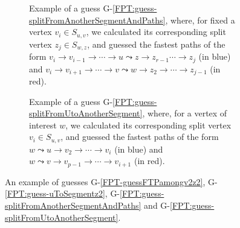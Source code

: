 \documentclass[a4paper,UKenglish,cleveref, autoref, thm-restate]{lipics-v2021}
\begin{document}
\begin{figure}[t]
	\begin{subfigure}[b]{0.48\textwidth}
			\centering
			\caption{Example of a guess G-\ref{FPT:guess-splitFromAnotherSegmentAndPaths}, where, for fixed a vertex $v_i \in S_{u,v}$,
				we calculated its corresponding split vertex $z_j \in S_{w,z}$,
				and guessed the fastest paths of the form
				$v_i \rightarrow v_{i-1} \rightarrow \cdots \rightarrow u \leadsto z \rightarrow z_{r-1} \cdots \rightarrow z_j$ (in blue) 
				and $v_i \rightarrow v_{i+1} \rightarrow \cdots \rightarrow v \leadsto w \rightarrow z_2 \rightarrow \cdots \rightarrow z_{j-1}$ (in red). 
				\label{fig:FPT-guessG6}}
		\end{subfigure}
	\quad
	\begin{subfigure}[b]{0.48\textwidth}
		\centering
	\caption{Example of a guess G-\ref{FPT:guess-splitFromUtoAnotherSegment}, where, for a vertex of interest $w$, 
		we
		calculated its corresponding split vertex $v_i \in S_{u,v}$,
		and guessed the fastest paths of the form
		$w \leadsto u \rightarrow v_2 \rightarrow \cdots \rightarrow v_i$  (in blue) 
		and $w \leadsto v \rightarrow v_{p-1} \rightarrow \cdots \rightarrow v_{i+1}$ (in red). 
		\label{fig:FPT-guessG7}}
	\end{subfigure}
\caption{An example of guesses G-\ref{FPT-guessFTPamongv2z2}, G-\ref{FPT:guess-uToSegmentz2}, G-\ref{FPT:guess-splitFromAnotherSegmentAndPaths} and G-\ref{FPT:guess-splitFromUtoAnotherSegment}.}
\end{figure}
\end{document}
